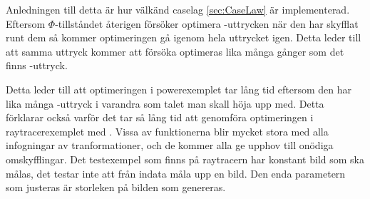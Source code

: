 \documentclass[Rapport]{subfiles}
\begin{document}
Anledningen till detta är hur välkänd caselag \ref{sec:CaseLaw} är 
implementerad. Eftersom $\Phi$-tillståndet återigen försöker optimera -uttrycken
när den har skyfflat runt dem så kommer optimeringen gå igenom hela uttrycket igen.
Detta leder till att samma uttryck kommer att försöka optimeras lika många gånger
som det finns -uttryck.  

Detta leder till att optimeringen i powerexemplet tar lång tid eftersom den har lika
många -uttryck i varandra som talet man skall höja upp med.
Detta förklarar också varför det tar så lång tid att genomföra optimeringen
i raytracerexemplet med . Vissa av funktionerna blir mycket stora med alla infogningar
av tranformationer, och de kommer alla ge upphov till onödiga omskyfflingar.
Det testexempel som finns på raytracern har konstant bild som ska målas, det
testar inte att från indata måla upp en bild. Den enda parametern som
justeras är storleken på bilden som genereras.

\end{document}
